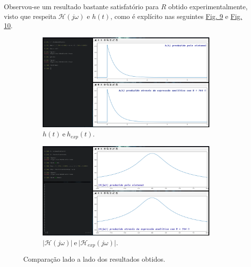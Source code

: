 Observou-se um resultado bastante satisfatório para \(R\) obtido experimentalmente, visto que respeita \(\mathcal{H}(j\omega)\) e \(h(t)\), como é explícito nas seguintes \hyperref[fig:multiplas_2]{Fig. 9} e \hyperref[fig:multiplas_3]{Fig. 10}.

\begin{figure}[H] 
    \begin{subfigure}[b]{0.5\linewidth}
        \centering
        \includegraphics[width=1\linewidth]{prints/ht_exp_lado_a_lado.png}
        \caption{\(h(t)\ \text{e}\ h_{exp}(t)\).} 
        \label{fig:ht_exp_lado_a_lado} 
    \end{subfigure}%
    \begin{subfigure}[b]{0.5\linewidth}
        \centering
        \includegraphics[width=1\linewidth]{prints/transf_ht_exp_lado_a_lado.png} 
        \caption{\(\vert \mathcal{H}(j\omega)\vert \ \text{e}\ \vert \mathcal{H}_{exp}(j\omega)\vert\).} 
        \label{fig:transf_ht_exp_lado_a_lado} 
    \end{subfigure} 
    \caption{Comparação lado a lado dos resultados obtidos.}
    \label{fig:multiplas_2}
\end{figure}


